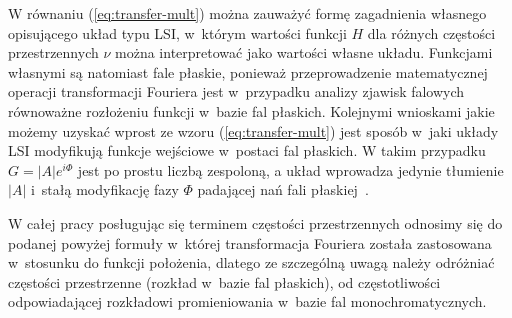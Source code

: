W równaniu (\ref{eq:transfer-mult}) można zauważyć formę zagadnienia własnego opisującego układ typu LSI, w~którym wartości funkcji $H$ dla różnych częstości przestrzennych $\nu$ można interpretować jako wartości własne układu. Funkcjami własnymi są natomiast fale płaskie, ponieważ przeprowadzenie matematycznej operacji transformacji Fouriera jest w~przypadku analizy zjawisk falowych równoważne rozłożeniu funkcji w~bazie fal płaskich.  Kolejnymi wnioskami jakie możemy uzyskać wprost ze wzoru (\ref{eq:transfer-mult}) jest sposób w~jaki układy LSI modyfikują funkcje wejściowe w~postaci fal płaskich. W takim przypadku $G=|A|e^{i \Phi}$ jest po prostu liczbą zespoloną, a układ wprowadza jedynie tłumienie $|A|$ i~stałą modyfikację fazy $\Phi$ padającej nań fali płaskiej~\cite{citeulike:2926459}.

W całej pracy posługując się terminem częstości przestrzennych odnosimy się do podanej powyżej formuły w~której transformacja Fouriera została zastosowana w~stosunku do funkcji położenia, dlatego ze szczególną uwagą należy odróżniać częstości przestrzenne (rozkład w~bazie fal płaskich), od częstotliwości odpowiadającej rozkładowi promieniowania w~bazie fal monochromatycznych.

